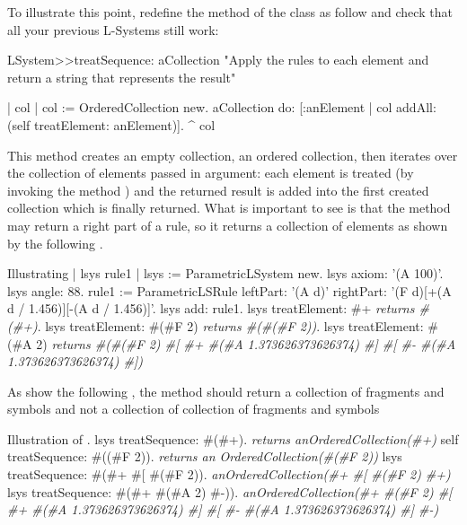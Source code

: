 To illustrate this point, redefine the method  of
the class  as follow and check that all your previous
L-Systems still work:

\begin{method}
LSystem>>treatSequence: aCollection
   "Apply the rules to each element and return a string that 
   represents the result"
   
   | col |
   col := OrderedCollection new.
   aCollection
      do: [:anElement | col addAll: (self treatElement: anElement)].
   ^ col
\end{method}

This method creates an empty collection, an ordered collection, then
iterates over the collection of elements passed in argument: each
element is treated (by invoking the method ) and the
returned result is added into the first created collection which is
finally returned.  What is important to see is that the method
 may return a right part of a rule, so it returns a
collection of elements as shown by the following
.


\begin{scriptwithtitle}{Illustrating }\label{src:treatel}
| lsys rule1 |
lsys := ParametricLSystem new.
lsys axiom: '(A 100)'.
lsys angle: 88.
rule1 := ParametricLSRule 
             leftPart: '(A d)' 
             rightPart: '(F d)[+(A d / 1.456)][-(A d / 1.456)]'.
lsys add: rule1.
lsys treatElement: #+
\emph{returns #(#+)}.
lsys treatElement: #(#F 2)
\emph{returns #(#(#F 2))}.
lsys treatElement: #(#A 2)
\emph{returns #(#(#F 2) #[ #+ #(#A 1.373626373626374) #] #[ #- #(#A 1.373626373626374) #])}
\end{scriptwithtitle}

As show the following , the method  should return a collection of fragments and symbols and not a collection of collection of fragments and symbols

\begin{scriptwithtitle}{Illustration of .}\label{src:treatseq}
lsys treatSequence: #(#+).
\emph{returns anOrderedCollection(#+)}
self treatSequence: #((#F 2)).
\emph{returns an OrderedCollection(#(#F 2))}
lsys treatSequence: #(#+ #[ #(#F 2)).
\emph{anOrderedCollection(#+ #[ #(#F 2) #+)}
lsys treatSequence: #(#+ #(#A 2) #-)).
\emph{anOrderedCollection(#+ #(#F 2) #[ #+ #(#A 1.373626373626374) #] #[ #- #(#A 1.373626373626374) #] #-)}
\end{scriptwithtitle}

